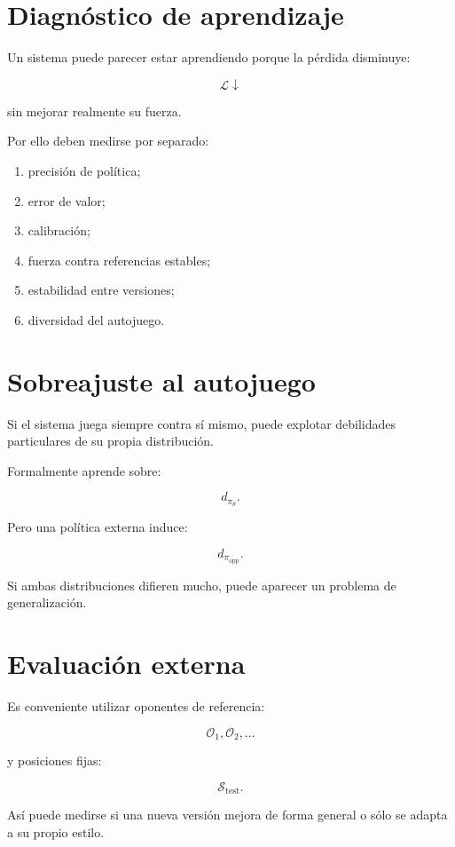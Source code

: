 \documentclass[11pt,a4paper]{article}
\begin{document}
\section{Diagnóstico de aprendizaje}

Un sistema puede parecer estar aprendiendo porque la pérdida disminuye:

\[
\mathcal{L}\downarrow
\]

sin mejorar realmente su fuerza.

Por ello deben medirse por separado:

\begin{enumerate}
    \item precisión de política;
    \item error de valor;
    \item calibración;
    \item fuerza contra referencias estables;
    \item estabilidad entre versiones;
    \item diversidad del autojuego.
\end{enumerate}

\section{Sobreajuste al autojuego}

Si el sistema juega siempre contra sí mismo, puede explotar debilidades particulares de su propia distribución.

Formalmente aprende sobre:

\[
d_{\pi_\theta}.
\]

Pero una política externa induce:

\[
d_{\pi_{\mathrm{opp}}}.
\]

Si ambas distribuciones difieren mucho, puede aparecer un problema de generalización.

\section{Evaluación externa}

Es conveniente utilizar oponentes de referencia:

\[
\mathcal{O}_1,\mathcal{O}_2,\ldots
\]

y posiciones fijas:

\[
\mathcal{S}_{\mathrm{test}}.
\]

Así puede medirse si una nueva versión mejora de forma general o sólo se adapta a su propio estilo.
\end{document}
